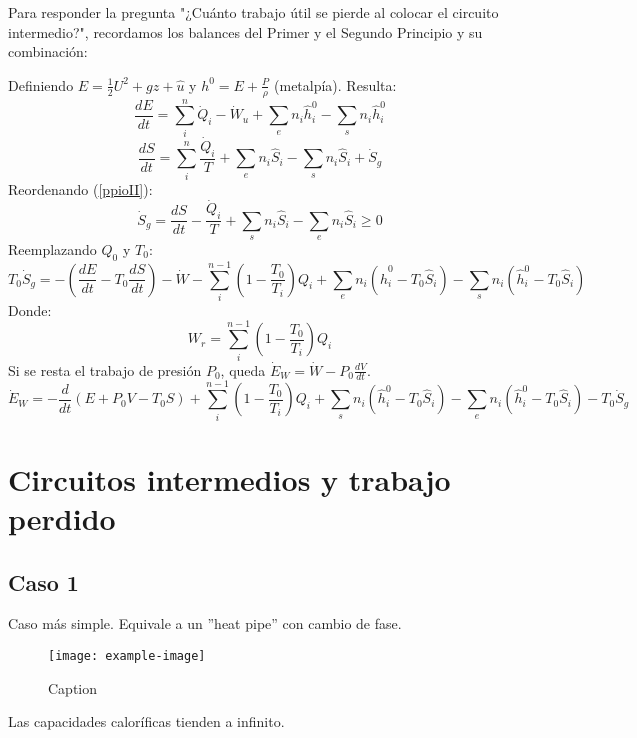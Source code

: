 \documentclass{article}
\begin{document}
Para responder la pregunta "¿Cuánto trabajo útil se pierde al colocar el circuito intermedio?", recordamos los balances del Primer y el Segundo Principio y su combinación:

Definiendo $E=\frac{1}{2}U^2+gz+\hat{u}$ y $h^0=E+\frac{P}{\rho}$ (metalpía). Resulta:
\begin{equation}
    \frac{dE}{dt}=\sum_{i}^{n} \dot{Q}_i - \dot{W}_u + \sum_{e}^{} n_i\hat{h}_i^0 - \sum_{s}^{} n_i\hat{h}_i^0 \label{ppioI}
\end{equation}
\begin{equation}
    \frac{dS}{dt}=\sum_{i}^{n} \frac{\dot{Q}_i}{T} + \sum_{e}^{} n_i\hat{S}_i - \sum_{s}^{} n_i\hat{S}_i + \dot{S}_g \label{ppioII}
\end{equation}
Reordenando (\ref{ppioII}):
\begin{equation}
    \dot{S}_g=\frac{dS}{dt}-\frac{\dot{Q}_i}{T} + \sum_{s}^{} n_i\hat{S}_i - \sum_{e}^{} n_i\hat{S}_i \geqslant 0
\end{equation}
Reemplazando $Q_0$ y $T_0$:
\begin{equation}
    T_0\dot{S}_g=-\left(\frac{dE}{dt}-T_0\frac{dS}{dt}\right)-\dot{W}-\sum_{i}^{n-1} \left(1-\frac{T_0}{T_i}\right)Q_i+\sum_{e}^{}n_i\left(\hat{h}_i^0-T_0\hat{S}_i\right)-\sum_{s}^{}n_i\left(\hat{h}_i^0-T_0\hat{S}_i\right)
\end{equation}
Donde:
\begin{equation}
    W_r=\sum_{i}^{n-1} \left(1-\frac{T_0}{T_i}\right)Q_i
\end{equation}
Si se resta el trabajo de presión $P_0$, queda $\dot{E}_W=\dot{W}-P_0\frac{dV}{dt}$.
\begin{equation}
    \dot{E}_W=-\frac{d}{dt}\left(E+P_0V-T_0S\right)+\sum_{i}^{n-1} \left(1-\frac{T_0}{T_i}\right)Q_i+\sum_{s}^{}n_i\left(\hat{h}_i^0-T_0\hat{S}_i\right)-\sum_{e}^{}n_i\left(\hat{h}_i^0-T_0\hat{S}_i\right)-T_0\dot{S}_g
\end{equation}
\section{Circuitos intermedios y trabajo perdido}
\subsection{Caso 1}
Caso más simple. Equivale a un ''heat pipe'' con cambio de fase.
\begin{figure}[H]
    \centering
    \texttt{[image: example-image]}
    \caption{Caption}
\end{figure}
Las capacidades caloríficas tienden a infinito.
\end{document}

